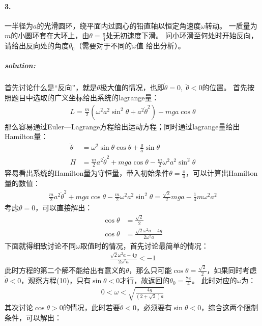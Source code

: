 \documentclass[a4paper]{ctexart}
\begin{document}
    \paragraph{3.}
    一半径为$a$的光滑圆环，绕平面内过圆心的铅直轴以恒定角速度$\omega$转动。
    一质量为$m$的小圆环套在大环上，由$\theta = \frac{\pi}{4}$处无初速度下滑。
    问小环滑至何处时开始反向，请给出反向处的角度$\theta_{0}$（需要对于不同的$\omega$值
    给出分析）。
    \subparagraph{solution:}
    首先讨论什么是“反向”，就是$\theta$极大值的情况，也即$\dot{\theta}=0,\;\ddot{\theta} < 0$的位置。
    首先按照题目中选取的广义坐标给出系统的lagrange量：
    \begin{align}
        L = \frac{m}{2}(\omega^{2}a^{2}\sin^{2}\theta + a^{2}\dot{\theta}^{2}) - mga\cos\theta
    \end{align}
    那么容易通过Euler—Lagrange方程给出运动方程；同时通过lagrange量给出Hamilton量：
    \begin{align}
        \ddot{\theta} &= \omega^{2}\sin\theta\cos\theta + \frac{g}{a}\sin\theta\\
        H &= \frac{m}{2}a^{2}\dot{\theta}^{2} + mga\cos\theta - \frac{m}{2}\omega^{2}a^{2}\sin^{2}\theta
    \end{align}
    容易看出系统的Hamilton量为守恒量，带入初始条件$\theta = \frac{\pi}{4}$，可以计算出Hamilton量的数值：
    \begin{align}
        \frac{m}{2}a^{2}\dot{\theta}^{2} + mga\cos\theta - \frac{m}{2}\omega^{2}a^{2}\sin^{2}\theta = \frac{\sqrt{2}}{2}mga - \frac{1}{4}m\omega^{2}a^{2}
    \end{align}
    考虑$\dot{\theta} = 0$，可以直接解出：
    \begin{align}
        \cos\theta &= \frac{\sqrt{2}}{2}\\
        \cos\theta &= \frac{\sqrt{2}\omega^{2}a - 4g}{2\omega^{2}a}
    \end{align}
    下面就得细致讨论不同$\omega$取值时的情况，首先讨论最简单的情况：
    \begin{align}
        \frac{\sqrt{2}\omega^{2}a - 4g}{2\omega^{2}a} < -1
    \end{align}
    此时方程的第二个解不能给出有意义的$\theta$，那么只可能$\cos\theta = \frac{\sqrt{2}}{2}$，如果同时考虑
    $\ddot{\theta} < 0$，观察方程(10)，只有$\sin\theta < 0$才行，故返回的$\theta_{0} = \frac{7\pi}{4}$。
    此时对应的$\omega$为：
    \begin{align}
        0 < \omega < \sqrt{\frac{4g}{(2 + \sqrt{2})a}}
    \end{align}
    其次讨论$\cos\theta > 0$的情况，此时若要$\ddot{\theta} < 0$，必须要有$\sin\theta < 0$，综合这两个限制条件，可以解出：
\end{document}
